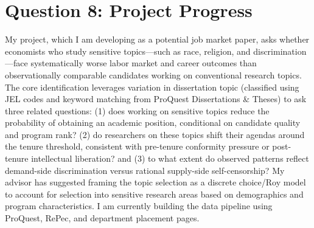 \documentclass[12pt]{article}
\begin{document}
\section*{Question 8: Project Progress}

My project, which I am developing as a potential job market paper,
asks whether economists who study sensitive topics---such as race, religion,
and discrimination---face systematically worse labor market and career
outcomes than observationally comparable candidates working on conventional
research topics. The core identification leverages variation in dissertation
topic (classified using JEL codes and keyword matching from ProQuest
Dissertations \& Theses) to ask three related questions: (1) does working
on sensitive topics reduce the probability of obtaining an academic
position, conditional on candidate quality and program rank? (2) do
researchers on these topics shift their agendas around the tenure
threshold, consistent with pre-tenure conformity pressure or post-tenure
intellectual liberation? and (3) to what extent do observed patterns
reflect demand-side discrimination versus rational supply-side
self-censorship? My advisor has suggested framing the topic selection
as a discrete choice/Roy model to account for selection into sensitive
research areas based on demographics and program characteristics. I am
currently building the data pipeline using ProQuest, RePec, and department
placement pages.
\end{document}
